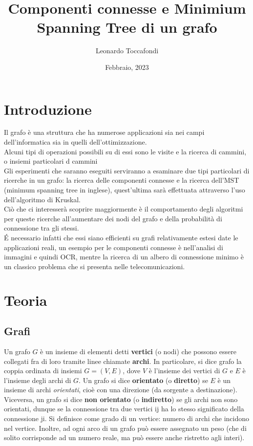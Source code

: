 \documentclass[
]{article}
\title{Componenti connesse e Minimium Spanning Tree di un grafo}
\author{Leonardo Toccafondi}
\date{Febbraio, 2023}
\begin{document}
\maketitle

\hypertarget{introduzione}{%
\section{Introduzione}\label{introduzione}}

Il grafo è una struttura che ha numerose applicazioni sia nei campi
dell'informatica sia in quelli dell'ottimizzazione.\\
Alcuni tipi di operazioni possibili su di essi sono le visite e la
ricerca di cammini, o insiemi particolari d cammini\\
Gli esperimenti che saranno eseguiti serviranno a esaminare due tipi
particolari di ricerche in un grafo: la ricerca delle componenti
connesse e la ricerca dell'MST (minimum spanning tree in inglese),
quest'ultima sarà effettuata attraverso l'uso dell'algoritmo di
Kruskal.\\
Ciò che ci interesserà scoprire maggiormente è il comportamento degli
algoritmi per queste ricerche all'aumentare dei nodi del grafo e della
probabilità di connessione tra gli stessi.\\
É necessario infatti che essi siano efficienti su grafi relativamente
estesi date le applicazioni reali, un esempio per le componenti connesse
è nell'analisi di immagini e quindi OCR, mentre la ricerca di un albero
di connessione minimo è un classico problema che si presenta nelle
telecomunicazioni.

\hypertarget{teoria}{%
\section{Teoria}\label{teoria}}

\hypertarget{grafi}{%
\subsection{Grafi}\label{grafi}}

Un grafo \(G\) è un insieme di elementi detti \textbf{vertici} (o nodi)
che possono essere collegati fra di loro tramite linee chiamate
\textbf{archi}. In particolare, si dice grafo la coppia ordinata di
insiemi \(G = (V, E)\), dove \(V\) è l'insieme dei vertici di \(G\) e
\(E\) è l'insieme degli archi di \(G\). Un grafo si dice
\textbf{orientato} (o \textbf{diretto}) se \(E\) è un insieme di archi
\emph{orientati}, cioè con una direzione (da sorgente a destinazione).
Viceversa, un grafo si dice \textbf{non orientato} (o
\textbf{indiretto}) se gli archi non sono orientati, dunque se la
connessione tra due vertici ij ha lo stesso significato della
connessione ji. Si definisce come grado di un vertice: numero di archi
che incidono nel vertice. Inoltre, ad ogni arco di un grafo può essere
assegnato un peso (che di solito corrisponde ad un numero reale, ma può
essere anche ristretto agli interi).
\end{document}
